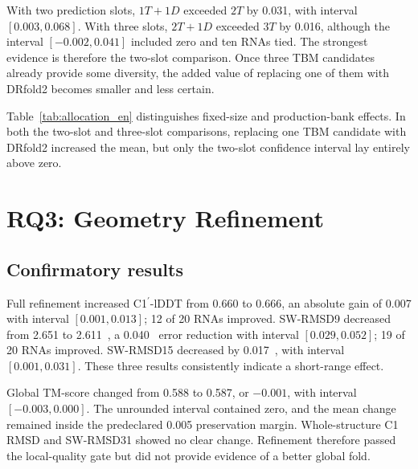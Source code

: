 \documentclass[12pt,a4paper,oneside]{report}
\newcommand{\cprime}{C1$^{\prime}$}
\newcommand{\angstrom}{\text{\AA}}
\begin{document}
With two prediction slots, $1T+1D$ exceeded $2T$ by 0.031, with interval
$[0.003,0.068]$. With three slots, $2T+1D$ exceeded $3T$ by 0.016, although the interval
$[-0.002,0.041]$ included zero and ten RNAs tied. The strongest evidence is therefore the
two-slot comparison. Once three TBM candidates already provide some diversity, the added
value of replacing one of them with DRfold2 becomes smaller and less certain.

\begin{table}[H]
\centering
\caption{Candidate allocation with Geometry Refinement disabled.}
\label{tab:allocation_en}
\end{table}

Table~\ref{tab:allocation_en} distinguishes fixed-size and production-bank effects. In
both the two-slot and three-slot comparisons, replacing one TBM candidate with DRfold2
increased the mean, but only the two-slot confidence interval lay entirely above zero.

\section{RQ3: Geometry Refinement}

\subsection{Confirmatory results}

Full refinement increased \cprime{}-lDDT from 0.660 to 0.666, an absolute gain of 0.007
with interval $[0.001,0.013]$; 12 of 20 RNAs improved. SW-RMSD9 decreased from 2.651 to
2.611~\angstrom{}, a 0.040~\angstrom{} error reduction with interval $[0.029,0.052]$;
19 of 20 RNAs improved. SW-RMSD15 decreased by 0.017~\angstrom{}, with interval
$[0.001,0.031]$. These three results consistently indicate a short-range effect.

Global TM-score changed from 0.588 to 0.587, or $-0.001$, with interval
$[-0.003,0.000]$. The unrounded interval contained zero, and the mean change remained
inside the predeclared 0.005 preservation margin. Whole-structure C1 RMSD and SW-RMSD31
showed no clear change. Refinement therefore passed the local-quality gate but did not
provide evidence of a better global fold.
\end{document}
